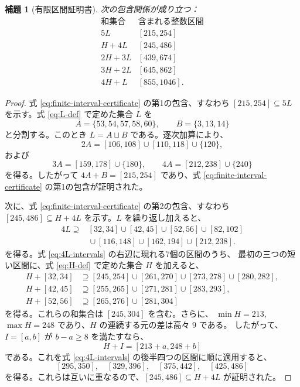 \documentclass[12pt]{ltjsarticle}
\theoremstyle{plain}
\newtheorem{lemma}[theorem]{補題}
\begin{document}
\begin{lemma}[有限区間証明書]\label{lem:finitefive}
次の包含関係が成り立つ：
\begin{equation}\label{eq:finite-interval-certificate}
\begin{array}{c|c}
\text{和集合}&\text{含まれる整数区間}\\ \hline
5L &[215,254]\\
H+4L &[245,486]\\
2H+3L &[439,674]\\
3H+2L &[645,862]\\
4H+L &[855,1046].
\end{array}
\end{equation}
\end{lemma}

\begin{proof}
式 \eqref{eq:finite-interval-certificate} の第1の包含、すなわち
$[215,254]\subseteq5L$ を示す。式 \eqref{eq:L-def} で定めた集合 $L$ を
\[
 A=\{53,54,57,58,60\},\qquad B=\{3,13,14\}
\]
と分割する。このとき $L=A\sqcup B$ である。逐次加算により、
\[
 2A=[106,108]\cup[110,118]\cup\{120\},
\]
および
\[
 3A=[159,178]\cup\{180\},\qquad
 4A=[212,238]\cup\{240\}
\]
を得る。したがって $4A+B=[215,254]$ であり、式
\eqref{eq:finite-interval-certificate} の第1の包含が証明された。

次に、式 \eqref{eq:finite-interval-certificate} の第2の包含、すなわち
$[245,486]\subseteq H+4L$ を示す。$L$ を繰り返し加えると、
\begin{equation}\label{eq:4L-intervals}
\begin{split}
4L\supseteq{}&[32,34]\cup[42,45]\cup[52,56]\cup[82,102]\\
 &{}\cup[116,148]\cup[162,194]\cup[212,238].
\end{split}
\end{equation}
を得る。式 \eqref{eq:4L-intervals} の右辺に現れる7個の区間のうち、
最初の三つの短い区間に、式 \eqref{eq:H-def} で定めた集合 $H$ を加えると、
\[
\begin{aligned}
H+[32,34]&\supseteq[245,254]\cup[261,270]
 \cup[273,278]\cup[280,282],\\
H+[42,45]&\supseteq[255,265]\cup[271,281]\cup[283,293],\\
H+[52,56]&\supseteq[265,276]\cup[281,304]
\end{aligned}
\]
を得る。これらの和集合は $[245,304]$ を含む。さらに、
$\min H=213$, $\max H=248$ であり、$H$ の連続する元の差は高々 $9$ である。
したがって、$I=[a,b]$ が $b-a\geq8$ を満たすなら、
\[
 H+I=[213+a,248+b]
\]
である。これを式 \eqref{eq:4L-intervals} の後半四つの区間に順に適用すると、
\[
 [295,350],\quad[329,396],\quad[375,442],\quad[425,486]
\]
を得る。これらは互いに重なるので、$[245,486]\subseteq H+4L$ が証明された。


\end{proof}
\end{document}
